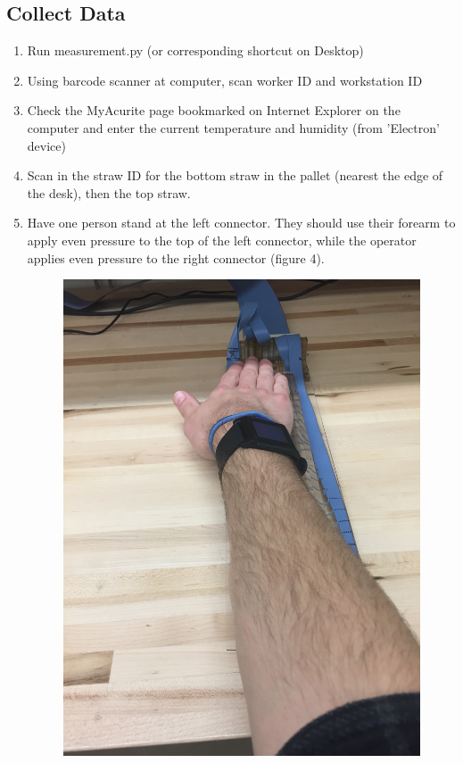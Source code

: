 \documentclass[letterpaper,12pt]{article}
\begin{document}
\subsection{Collect Data}
\begin{enumerate}
	\item Run measurement.py (or corresponding shortcut on Desktop)
	\item Using barcode scanner at computer, scan worker ID and workstation ID
	\item Check the MyAcurite page bookmarked on Internet Explorer on the computer and enter the current temperature and humidity (from 'Electron' device)
	\item Scan in the straw ID for the bottom straw in the pallet (nearest the edge of the desk), then the top straw.
	\item Have one person stand at the left connector. They should use their forearm to apply even pressure to the top of the left connector, while the operator applies even pressure to the right connector (figure 4).
	\begin{figure}[h]
		\centering
		\includegraphics[scale=0.075 , angle=270]{closed_right_pressure}

\end{figure}
\end{enumerate}
\end{document}
